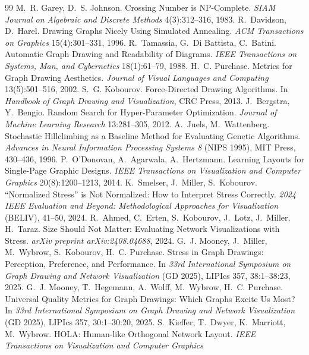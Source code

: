 \documentclass[11pt]{article}
\begin{document}
\begin{thebibliography}{99}
 M.~R. Garey, D.~S. Johnson. Crossing Number is NP-Complete. \emph{SIAM
 Journal on Algebraic and Discrete Methods} 4(3):312--316, 1983.
 R.~Davidson, D.~Harel. Drawing Graphs Nicely Using Simulated Annealing.
 \emph{ACM Transactions on Graphics} 15(4):301--331, 1996.
 R.~Tamassia, G.~Di Battista, C.~Batini. Automatic Graph Drawing and
 Readability of Diagrams. \emph{IEEE Transactions on Systems, Man, and Cybernetics}
 18(1):61--79, 1988.
 H.~C. Purchase. Metrics for Graph Drawing Aesthetics. \emph{Journal
 of Visual Languages and Computing} 13(5):501--516, 2002.
 S.~G. Kobourov. Force-Directed Drawing Algorithms. In \emph{Handbook
 of Graph Drawing and Visualization}, CRC Press, 2013.
 J.~Bergstra, Y.~Bengio. Random Search for Hyper-Parameter
 Optimization. \emph{Journal of Machine Learning Research} 13:281--305, 2012.
 A.~Juels, M.~Wattenberg. Stochastic Hillclimbing as a Baseline Method for
 Evaluating Genetic Algorithms. \emph{Advances in Neural Information Processing Systems 8}
 (NIPS 1995), MIT Press, 430--436, 1996.
 P.~O'Donovan, A.~Agarwala, A.~Hertzmann. Learning Layouts for
 Single-Page Graphic Designs. \emph{IEEE Transactions on Visualization and Computer
 Graphics} 20(8):1200--1213, 2014.
 K.~Smelser, J.~Miller, S.~Kobourov. ``Normalized Stress'' is Not
 Normalized: How to Interpret Stress Correctly. \emph{2024 IEEE Evaluation and Beyond:
 Methodological Approaches for Visualization} (BELIV), 41--50, 2024.
 R.~Ahmed, C.~Erten, S.~Kobourov, J.~Lotz, J.~Miller, H.~Taraz. Size
 Should Not Matter: Evaluating Network Visualizations with Stress. \emph{arXiv preprint
 arXiv:2408.04688}, 2024.
 G.~J. Mooney, J.~Miller, M.~Wybrow, S.~Kobourov, H.~C. Purchase.
 Stress in Graph Drawings: Perception, Preference, and Performance. In \emph{33rd
 International Symposium on Graph Drawing and Network Visualization} (GD 2025), LIPIcs 357,
 38:1--38:23, 2025.
 G.~J. Mooney, T.~Hegemann, A.~Wolff, M.~Wybrow, H.~C. Purchase.
 Universal Quality Metrics for Graph Drawings: Which Graphs Excite Us Most? In \emph{33rd
 International Symposium on Graph Drawing and Network Visualization} (GD 2025), LIPIcs 357,
 30:1--30:20, 2025.
 S.~Kieffer, T.~Dwyer, K.~Marriott, M.~Wybrow. HOLA: Human-like Orthogonal
 Network Layout. \emph{IEEE Transactions on Visualization and Computer Graphics}

\end{thebibliography}
\end{document}

